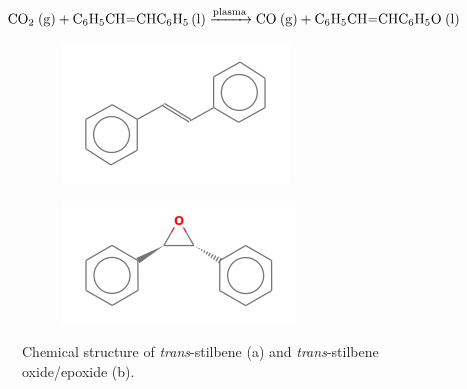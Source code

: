 \begin{equation}
    \ce{CO$_2$  (g) + C_6H_5CH=CHC_6H_5 (l) ->[plasma] CO (g) + C_6H_5CH=CHC_6H_5O (l)}
\end{equation} 

\begin{figure}[h!]
    \centering
    \begin{subfigure}[b]{0.35\textwidth}
        \centering
        \includegraphics[width=\textwidth]{chapter_3/figures/ts.png}
        \caption{}
    \end{subfigure}
    \quad\quad
    \begin{subfigure}[b]{0.35\textwidth}  
        \centering 
        \includegraphics[width=\textwidth]{chapter_3/figures/tse.png}
        \caption{}
    \end{subfigure}

    \caption{\small Chemical structure of \textit{trans}-stilbene (a) and \textit{trans}-stilbene oxide/epoxide (b).} 
    \label{fig:epoxidation_diagram}
\end{figure}



